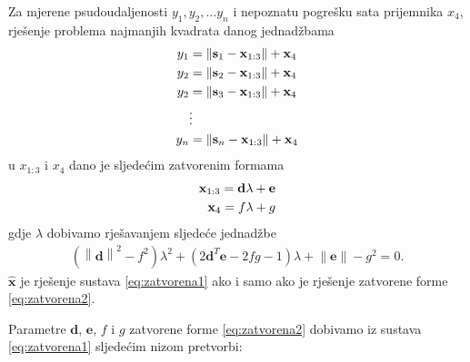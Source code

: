 \documentclass[a4paper,twoside,12pt]{memoir} %
\begin{document}
Za mjerene psudoudaljenosti $y_1,y_2, \hdots y_n$ i nepoznatu pogrešku sata prijemnika $x_4$, rješenje 
problema najmanjih kvadrata danog jednadžbama
\begin{align}\label{eq:zatvorena1}
y_1 &= \left \| \mathbf{s}_1 - \mathbf{x}_{1:3} \right \| + \mathbf{x}_{4} \notag \\
y_2 &= \left \| \mathbf{s}_2 - \mathbf{x}_{1:3} \right \| + \mathbf{x}_{4} \notag \\
y_2 &= \left \| \mathbf{s}_3 - \mathbf{x}_{1:3} \right \| + \mathbf{x}_{4} \\
&\vdots \notag \\
y_n &= \left \| \mathbf{s}_n - \mathbf{x}_{1:3} \right \| + \mathbf{x}_{4} \notag 
\end{align}
u $x_{1:3}$ i $x_4$ dano je sljedećim zatvorenim formama
\begin{align}\label{eq:zatvorena2}
	\mathbf{x}_{1:3} = \mathbf{d}\lambda + \mathbf{e} \notag \\
	\mathbf{x}_{4} = f\lambda + g
\end{align}
gdje $\lambda$ dobivamo rješavanjem sljedeće jednadžbe
\begin{align*}
	( \left \|\mathbf{d}\right \|^2 - f^2 ) \lambda^2 + (2\mathbf{d}^T \mathbf{e} - 2fg - 1)\lambda + \left \|\mathbf{e}\right \| - g^2 = 0.
\end{align*}
 $\hat{\mathbf{x}}$ je rješenje sustava \ref{eq:zatvorena1} ako i samo ako je
rješenje zatvorene forme \ref{eq:zatvorena2}.

Parametre $\mathbf{d}$, $\mathbf{e}$, $f$ i $g$ zatvorene forme \ref{eq:zatvorena2} dobivamo iz sustava \ref{eq:zatvorena1}
sljedećim nizom pretvorbi: \\
\end{document}
